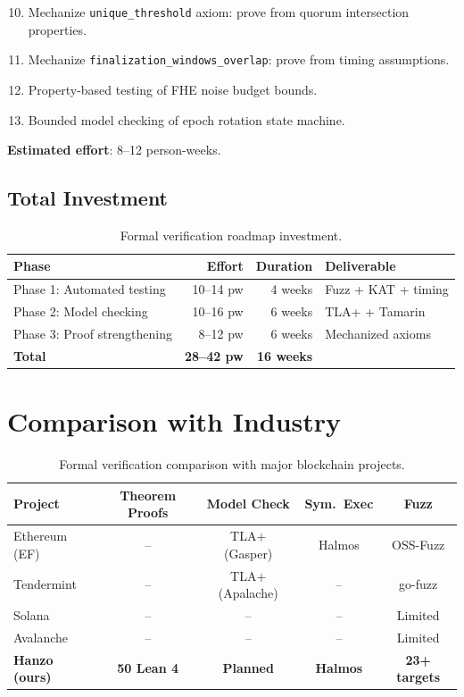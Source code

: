 \documentclass[11pt,letterpaper]{article}
\begin{document}
\begin{enumerate}
\setcounter{enumi}{9}
\item Mechanize \texttt{unique\_threshold} axiom: prove from quorum intersection properties.
\item Mechanize \texttt{finalization\_windows\_overlap}: prove from timing assumptions.
\item Property-based testing of FHE noise budget bounds.
\item Bounded model checking of epoch rotation state machine.
\end{enumerate}

\textbf{Estimated effort}: 8--12 person-weeks.

\subsection{Total Investment}

\begin{table}[H]
\centering
\begin{tabular}{@{}lrrl@{}}
\toprule
\textbf{Phase} & \textbf{Effort} & \textbf{Duration} & \textbf{Deliverable} \\
\midrule
Phase 1: Automated testing & 10--14 pw & 4 weeks & Fuzz + KAT + timing \\
Phase 2: Model checking & 10--16 pw & 6 weeks & TLA+ + Tamarin \\
Phase 3: Proof strengthening & 8--12 pw & 6 weeks & Mechanized axioms \\
\midrule
\textbf{Total} & \textbf{28--42 pw} & \textbf{16 weeks} & \\
\bottomrule
\end{tabular}
\caption{Formal verification roadmap investment.}
\label{tab:roadmap-cost}
\end{table}

\section{Comparison with Industry}

\begin{table}[H]
\centering
\small
\begin{tabular}{@{}lcccc@{}}
\toprule
\textbf{Project} & \textbf{Theorem Proofs} & \textbf{Model Check} & \textbf{Sym.\ Exec} & \textbf{Fuzz} \\
\midrule
Ethereum (EF) & -- & TLA+ (Gasper) & Halmos & OSS-Fuzz \\
Tendermint & -- & TLA+ (Apalache) & -- & go-fuzz \\
Solana & -- & -- & -- & Limited \\
Avalanche & -- & -- & -- & Limited \\
\textbf{Hanzo (ours)} & \textbf{50 Lean 4} & \textbf{Planned} & \textbf{Halmos} & \textbf{23+ targets} \\
\bottomrule
\end{tabular}
\caption{Formal verification comparison with major blockchain projects.}
\label{tab:industry-comparison}
\end{table}
\end{document}

